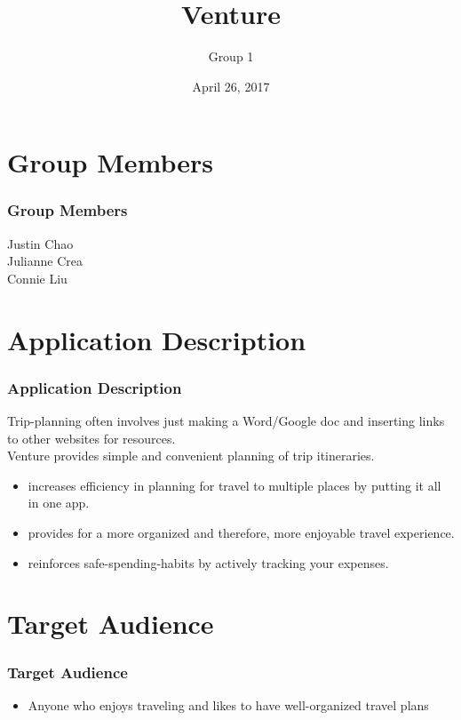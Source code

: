 \documentclass{beamer}
\title{Venture}
\author{Group 1}
\institute{CS 329E \\ The Universty of Texas at Austin}
\date{April 26, 2017}
\begin{document}
\frame{\titlepage}

\section{Group Members}
\begin{frame}
\frametitle{Group Members}
    \begin{center}
        Justin Chao \\
        Julianne Crea \\
        Connie Liu 
    \end{center}
\end{frame}

\section{Application Description}
\begin{frame}
\frametitle{Application Description}
        Trip-planning often involves just making a Word/Google doc and inserting links to
            other websites for resources. \\ 
        Venture provides simple and convenient planning of trip itineraries.
    \begin{itemize}
        \item increases efficiency in planning for travel to multiple places by putting it all in
            one app.
        \item provides for a more organized and therefore, more enjoyable travel experience.
        \item reinforces safe-spending-habits by actively tracking your expenses.
    \end{itemize}
\end{frame}

\section{Target Audience}
\begin{frame}
\frametitle{Target Audience}
    \begin{itemize}
        \item Anyone who enjoys traveling and likes to have well-organized travel plans
    \end{itemize}
\end{frame}
\end{document}
